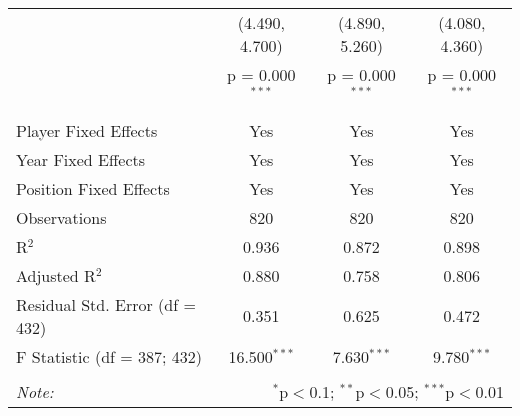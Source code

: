 \documentclass[12pt]{article}
\begin{document}
\begin{landscape}
\begin{table}[!htbp]
\begin{tabular}{@{\extracolsep{5pt}}lccc}
			& (4.490, 4.700) & (4.890, 5.260) & (4.080, 4.360) \\ 
			& p = 0.000$^{***}$ & p = 0.000$^{***}$ & p = 0.000$^{***}$ \\ 
			& & & \\ 
			\hline \\[-1.8ex] 
			Player Fixed Effects & Yes & Yes & Yes \\ 
			Year Fixed Effects & Yes & Yes & Yes \\ 
			Position Fixed Effects & Yes & Yes & Yes \\ 
			Observations & 820 & 820 & 820 \\ 
			R$^{2}$ & 0.936 & 0.872 & 0.898 \\ 
			Adjusted R$^{2}$ & 0.880 & 0.758 & 0.806 \\ 
			Residual Std. Error (df = 432) & 0.351 & 0.625 & 0.472 \\ 
			F Statistic (df = 387; 432) & 16.500$^{***}$ & 7.630$^{***}$ & 9.780$^{***}$ \\ 
			\hline 
			\hline \\[-1.8ex] 
			\textit{Note:}  & \multicolumn{3}{r}{$^{*}$p$<$0.1; $^{**}$p$<$0.05; $^{***}$p$<$0.01} \\ 
		\end{tabular} 
	\end{table} 


\end{landscape}
\end{document}
